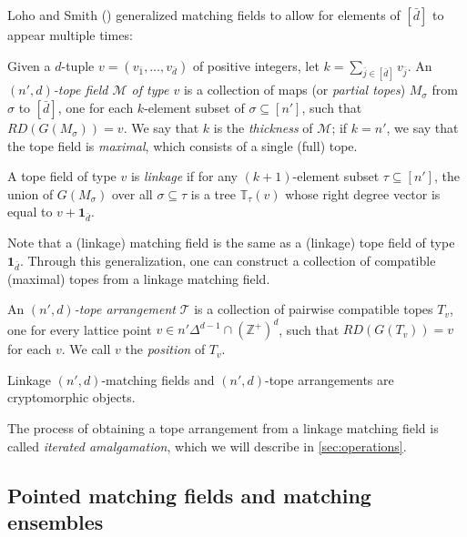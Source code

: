 \documentclass[letterpaper,reqno,11pt]{amsart}
\begin{document}
Loho and Smith (\cite{FieldLattice}) generalized matching fields to allow for elements of $[\bar{d}]$ to appear multiple times:

\begin{definition}
    Given a $d$-tuple $v = (v_{\bar{1}}, \dots, v_{\bar{d}})$ of positive integers, let $k = \sum_{\bar{j}\in[\bar{d}]} v_{\bar{j}}$. An \emph{$(n', d)$-tope field $\mathcal{M}$ of type $v$} is a collection of maps (or \emph{partial topes}) $M_{\sigma}$ from $\sigma$ to $[\bar{d}]$, one for each $k$-element subset of $\sigma\subseteq[n']$, such that $RD(G(M_{\sigma})) = v$. We say that $k$ is the \emph{thickness} of $\mathcal{M}$; if $k = n'$, we say that the tope field is \emph{maximal}, which consists of a single (full) tope.

    A tope field of type $v$ is \emph{linkage} if for any $(k+1)$-element subset $\tau\subseteq [n']$, the union of $G(M_\sigma)$ over all $\sigma\subseteq \tau$ is a tree $\mathbb{T}_{\tau}(v)$ whose right degree vector is equal to $v + \mathbf{1}_{\bar{d}}$.
\end{definition}

Note that a (linkage) matching field is the same as a (linkage) tope field of type $\mathbf{1}_{\bar{d}}$. Through this generalization, one can construct a collection of compatible (maximal) topes from a linkage matching field.

\begin{definition}
    An \emph{$(n', d)$-tope arrangement} $\mathcal{T}$ is a collection of pairwise compatible topes $T_v$, one for every lattice point $v \in n'\Delta^{d-1}\cap (\mathbb{Z}^+)^{d}$, such that $RD(G(T_v)) = v$ for each $v$. We call $v$ the \emph{position} of $T_v$.
\end{definition}

\begin{theorem}\label{thm:topearr}
    Linkage $(n',d)$-matching fields and $(n',d)$-tope arrangements are cryptomorphic objects.
\end{theorem}

The process of obtaining a tope arrangement from a linkage matching field is called \emph{iterated amalgamation}, which we will describe in \cref{sec:operations}.

\subsection{Pointed matching fields and matching ensembles}
\end{document}
